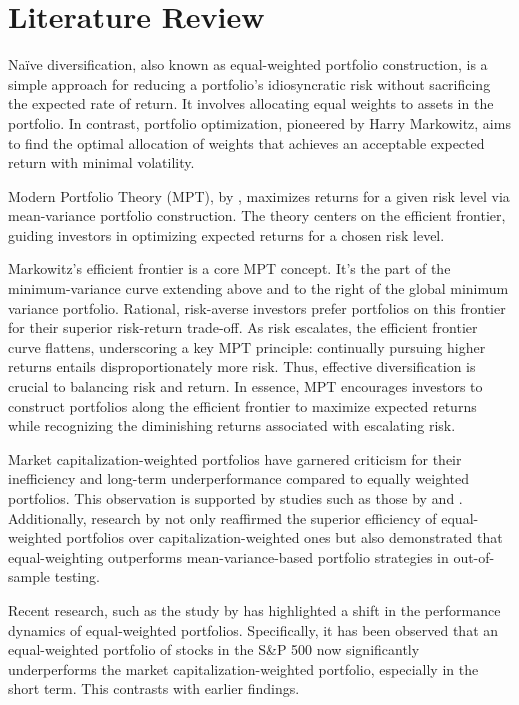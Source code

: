 \chapter{Literature Review}
\label{mathchapter}
Naïve diversification, also known as equal-weighted portfolio construction, is a simple approach for reducing a portfolio's idiosyncratic risk without sacrificing the expected rate of return. It involves allocating equal weights to assets in the portfolio. In contrast, portfolio optimization, pioneered by Harry Markowitz, aims to find the optimal allocation of weights that achieves an acceptable expected return with minimal volatility.

Modern Portfolio Theory (MPT), by \citep{Markowitz1952}, maximizes returns for a given risk level via mean-variance portfolio construction. The theory centers on the efficient frontier, guiding investors in optimizing expected returns for a chosen risk level.

Markowitz's efficient frontier is a core MPT concept. It's the part of the minimum-variance curve extending above and to the right of the global minimum variance portfolio. Rational, risk-averse investors prefer portfolios on this frontier for their superior risk-return trade-off. As risk escalates, the efficient frontier curve flattens, underscoring a key MPT principle: continually pursuing higher returns entails disproportionately more risk. Thus, effective diversification is crucial to balancing risk and return. In essence, MPT encourages investors to construct portfolios along the efficient frontier to maximize expected returns while recognizing the diminishing returns associated with escalating risk.

Market capitalization-weighted portfolios have garnered criticism for their inefficiency and long-term underperformance compared to equally weighted portfolios. This observation is supported by studies such as those by \citep{Bolognesi201314} and \citep{Malladi2017188}. Additionally, research by \citep{DeMiguel20091915} not only reaffirmed the superior efficiency of equal-weighted portfolios over capitalization-weighted ones but also demonstrated that equal-weighting outperforms mean-variance-based portfolio strategies in out-of-sample testing.

Recent research, such as the study by \citep{Taljaard20211855} has highlighted a shift in the performance dynamics of equal-weighted portfolios. Specifically, it has been observed that an equal-weighted portfolio of stocks in the S\&P 500 now significantly underperforms the market capitalization-weighted portfolio, especially in the short term. This contrasts with earlier findings.

